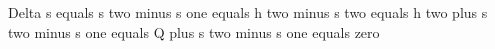 Delta s equals s two minus s one equals h two minus s two equals h two plus s two minus s one equals Q plus s two minus s one equals zero